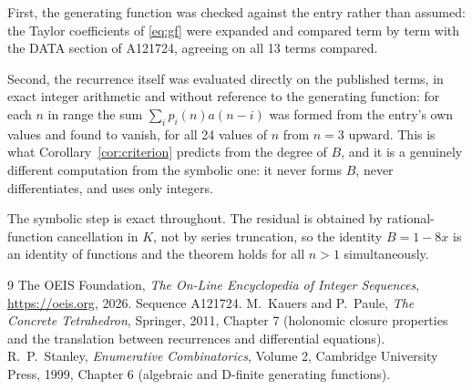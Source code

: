 \documentclass[11pt,a4paper]{article}
\theoremstyle{plain}
\theoremstyle{definition}
\begin{document}
First, the generating function was checked against the entry rather than assumed: the
Taylor coefficients of \eqref{eq:gf} were expanded and compared term by term with the DATA
section of A121724, agreeing on all 13 terms compared.

Second, the recurrence itself was evaluated directly on the published terms, in exact
integer arithmetic and without reference to the generating function: for each $n$ in range
the sum $\sum_{i}p_{i}(n)a(n-i)$ was formed from the entry's own values and found to
vanish, for all 24 values of $n$ from $n=3$ upward. This is what
Corollary~\ref{cor:criterion} predicts from the degree of $B$, and it is a genuinely
different computation from the symbolic one: it never forms $B$, never differentiates, and
uses only integers.

The symbolic step is exact throughout. The residual is obtained by rational-function
cancellation in $K$, not by series truncation, so the identity $B=1 - 8 x$ is an
identity of functions and the theorem holds for all $n>1$ simultaneously.

\begin{thebibliography}{9}
 The OEIS Foundation, \emph{The On-Line Encyclopedia of Integer Sequences},
\url{https://oeis.org}, 2026. Sequence A121724.
 M.~Kauers and P.~Paule, \emph{The Concrete Tetrahedron}, Springer, 2011,
Chapter 7 (holonomic closure properties and the translation between recurrences and
differential equations).
 R.~P.~Stanley, \emph{Enumerative Combinatorics}, Volume 2, Cambridge
University Press, 1999, Chapter 6 (algebraic and D-finite generating functions).
\end{thebibliography}
\end{document}
